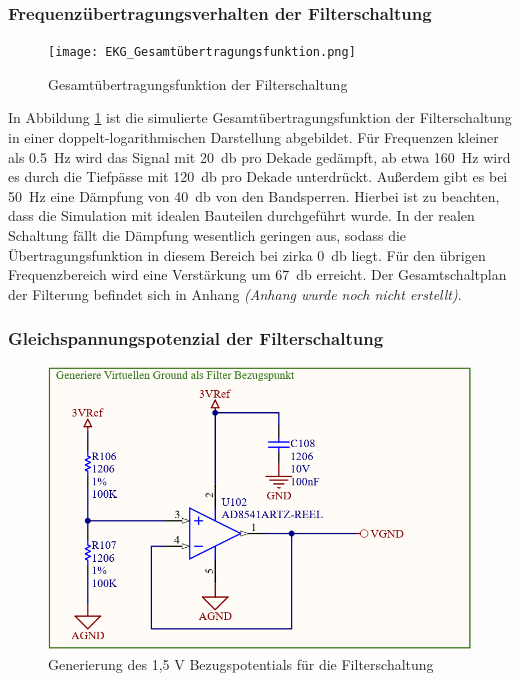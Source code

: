 \subsubsection{Frequenzübertragungsverhalten der Filterschaltung}

\begin{figure} [!h]
	\texttt{[image: EKG\_Gesamtübertragungsfunktion.png]}
	\caption{Gesamtübertragungsfunktion der Filterschaltung}
	\label{Bodediagramm Filterschaltung} 
\end{figure}

In Abbildung \ref{Bodediagramm Filterschaltung} ist die simulierte Gesamtübertragungsfunktion der Filterschaltung in einer doppelt-logarithmischen Darstellung abgebildet. Für Frequenzen kleiner als \SI{0,5}{\hertz} wird das Signal mit \SI{20}{\decibel} pro Dekade gedämpft, ab etwa \SI{160}{\hertz} wird es durch die Tiefpässe mit \SI{120}{\decibel} pro Dekade unterdrückt. Außerdem gibt es bei \SI{50}{\hertz} eine Dämpfung von \SI{40}{\decibel} von den Bandsperren. Hierbei ist zu beachten, dass die Simulation mit idealen Bauteilen durchgeführt wurde. In der realen Schaltung fällt die Dämpfung wesentlich geringen aus, sodass die Übertragungsfunktion in diesem Bereich bei zirka \SI{0}{\decibel} liegt. Für den übrigen Frequenzbereich wird eine Verstärkung um \SI{67}{\decibel} erreicht. Der Gesamtschaltplan der Filterung befindet sich in Anhang \textit{(Anhang wurde noch nicht erstellt)}. 

\subsubsection{Gleichspannungspotenzial der Filterschaltung}

\begin{figure} [!h]
	\includegraphics[width=\textwidth] {EKG_virtueller_Ground.png}
	\caption{Generierung des 1,5 V Bezugspotentials für die Filterschaltung}
	\label{Virtueller GND} 
\end{figure}

